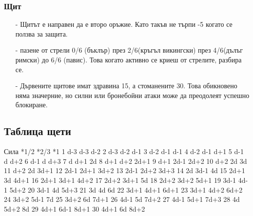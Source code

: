 \subsubsection{Щит}
\begin{itemize}
\item[-]{Щитът е направен да е второ оръжие. Като такъв не търпи -5 когато се ползва за защита.}
\item[-]{пазене от стрели 0/6 (бъклър) през 2/6(кръгъл викингски) през 4/6(дълъг римски) до 6/6 (павис). Това когато активно се криеш от стрелите, разбира се.}
\item[-]{Дървените щитове имат здравина 15, а стоманените 30. Това обикновено няма значерние, но силни или бронебойни атаки може да преодолеят успешно блокиране.}
\end{itemize}

\subsection{Таблица щети}
Сила *1/2 *2/3 *1
1  d-3  d-3  d-2
2  d-3  d-2  d-1
3  d-2  d-1  d-1
4  d-2  d-1  d+1
5  d-1  d    d+2
6  d-1  d    d+3
7  d    d+1  2d
8  d+1  d+2  2d+1
9  d+1  2d-1 2d+2
10 d+2  2d   3d
11 d+2  2d   3d+1
12 2d-1 2d+1 3d+2
13 2d-1 2d+2 3d+3
14 2d   3d-1 4d
15 2d+1 3d   4d+1
16 2d+1 3d+1 4d+2
17 2d+2 3d+1 5d
18 2d+2 3d+2 5d+1
19 3d-1 4d-1 5d+2
20 3d-1 4d   5d+3
21 3d   4d   6d
22 3d+1 4d+1 6d+1
23 3d+1 4d+2 6d+2
24 3d+2 5d-1 7d
25 3d+2 6d   7d+1
26 4d-1 5d   7d+2
27 4d-1 5d+1 7d+3
28 4d   5d+2 8d
29 4d+1 6d-1 8d+1
30 4d+1 6d   8d+2
